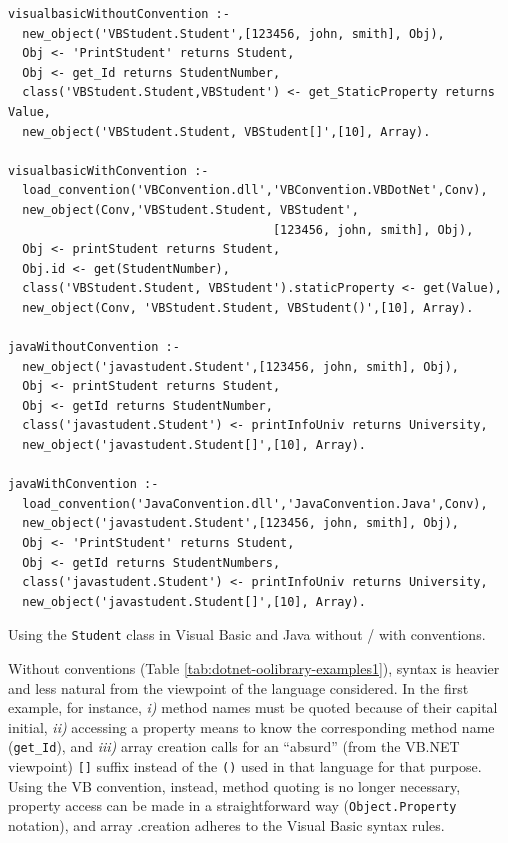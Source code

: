 \begin{table}
{\small
\begin{verbatim}
visualbasicWithoutConvention :-
  new_object('VBStudent.Student',[123456, john, smith], Obj),
  Obj <- 'PrintStudent' returns Student,
  Obj <- get_Id returns StudentNumber,
  class('VBStudent.Student,VBStudent') <- get_StaticProperty returns Value,
  new_object('VBStudent.Student, VBStudent[]',[10], Array).

visualbasicWithConvention :-
  load_convention('VBConvention.dll','VBConvention.VBDotNet',Conv),
  new_object(Conv,'VBStudent.Student, VBStudent',
                                     [123456, john, smith], Obj),
  Obj <- printStudent returns Student,
  Obj.id <- get(StudentNumber),
  class('VBStudent.Student, VBStudent').staticProperty <- get(Value),
  new_object(Conv, 'VBStudent.Student, VBStudent()',[10], Array).

javaWithoutConvention :-
  new_object('javastudent.Student',[123456, john, smith], Obj),
  Obj <- printStudent returns Student,
  Obj <- getId returns StudentNumber,
  class('javastudent.Student') <- printInfoUniv returns University,
  new_object('javastudent.Student[]',[10], Array).

javaWithConvention :-
  load_convention('JavaConvention.dll','JavaConvention.Java',Conv),
  new_object('javastudent.Student',[123456, john, smith], Obj),
  Obj <- 'PrintStudent' returns Student,
  Obj <- getId returns StudentNumbers,
  class('javastudent.Student') <- printInfoUniv returns University,
  new_object('javastudent.Student[]',[10], Array).
\end{verbatim}
}
  \caption{Using the \texttt{Student} class in Visual Basic and Java without / with conventions.}
  \label{tab:dotnet-oolibrary-examples1}
\end{table}

\noindent Without conventions (Table \ref{tab:dotnet-oolibrary-examples1}), syntax is heavier and less natural from the viewpoint of the language considered.
In the first example, for instance, \textit{i)} method names must be quoted because of their capital initial, \textit{ii)} accessing a property means to know the corresponding method name (\texttt{get\_Id}), and \textit{iii)} array creation calls for an ``absurd'' (from the VB.NET viewpoint) \texttt{[]} suffix instead of the \texttt{()} used in that language for that purpose.
Using the VB convention, instead, method quoting is no longer necessary, property access can be made in a straightforward way (\texttt{Object.Property} notation), and array .creation adheres to the Visual Basic syntax rules.


